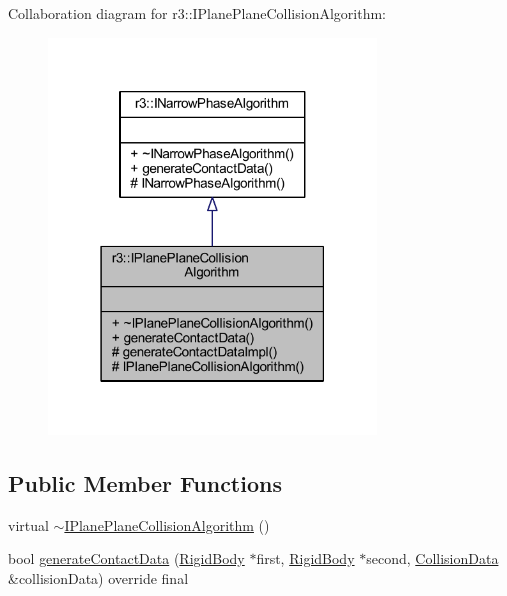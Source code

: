 Collaboration diagram for r3\+:\+:I\+Plane\+Plane\+Collision\+Algorithm\+:\nopagebreak
\begin{figure}[H]
\begin{center}
\leavevmode
\includegraphics[width=247pt]{classr3_1_1_i_plane_plane_collision_algorithm__coll__graph}
\end{center}
\end{figure}
\subsection*{Public Member Functions}
\begin{DoxyCompactItemize}
\item 
virtual \mbox{\hyperlink{classr3_1_1_i_plane_plane_collision_algorithm_a93e78b07d3d296f30a5ab926a3a42323}{$\sim$\+I\+Plane\+Plane\+Collision\+Algorithm}} ()
\item 
bool \mbox{\hyperlink{classr3_1_1_i_plane_plane_collision_algorithm_a910587be6f6537f86bbcc5e3a9b40223}{generate\+Contact\+Data}} (\mbox{\hyperlink{classr3_1_1_rigid_body}{Rigid\+Body}} $\ast$first, \mbox{\hyperlink{classr3_1_1_rigid_body}{Rigid\+Body}} $\ast$second, \mbox{\hyperlink{classr3_1_1_collision_data}{Collision\+Data}} \&collision\+Data) override final
\end{DoxyCompactItemize}
